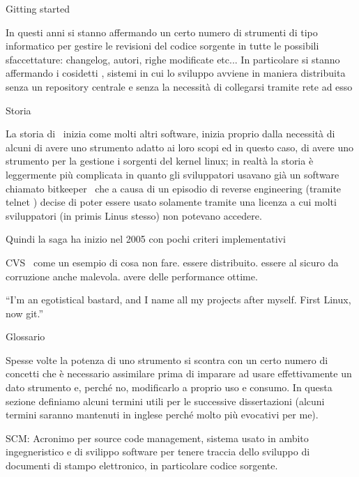 \capitolo Gitting started

In questi anni si stanno affermando un certo numero di strumenti di tipo
informatico per gestire le revisioni del codice sorgente in tutte le possibili
sfaccettature: changelog, autori, righe modificate etc... In particolare si
stanno affermando i cosidetti , sistemi
in cui lo sviluppo avviene in maniera distribuita senza un repository centrale e
senza la necessit\`a di collegarsi tramite rete ad esso

\sezione Storia

La storia di \git\ inizia come molti altri software, inizia proprio dalla
necessit\`a di alcuni di avere uno strumento adatto ai loro scopi ed in questo
caso, di avere uno strumento per la gestione i sorgenti del kernel linux; in
realt\`a la storia \`e leggermente pi\`u complicata in quanto gli sviluppatori
usavano gi\`a un software chiamato \cc bitkeeper \ che a causa di un episodio di
reverse engineering (tramite \cc telnet ) decise di poter essere usato solamente
tramite una licenza a cui molti sviluppatori (in primis Linus stesso)
non potevano accedere.

Quindi la saga ha inizio nel 2005 con pochi criteri implementativi

\iniziaelenco
\li \cc CVS \ come un esempio di cosa non fare.
\li essere distribuito.
\li essere al sicuro da corruzione anche malevola.
\li avere delle performance ottime.
\fineelenco

\citazione ``I'm an egotistical bastard, and I name all my projects after
myself. First Linux, now git.''

\sezione Glossario

Spesse volte la potenza di uno strumento si scontra con un certo numero di
concetti che \`e necessario assimilare prima di imparare ad usare
effettivamente un dato strumento e, perch\'e no, modificarlo a proprio uso e
consumo. In questa sezione definiamo alcuni termini utili per le successive
dissertazioni (alcuni termini saranno mantenuti in inglese perch\'e molto pi\`u
evocativi per me).
\medskip

\elemento SCM: Acronimo per source code management, sistema usato in ambito
ingegneristico e di svilippo software per tenere traccia dello sviluppo di
documenti di stampo elettronico, in particolare codice sorgente.

